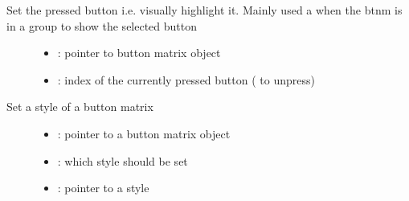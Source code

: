 \documentclass[letterpaper,10pt,english]{sphinxmanual}
\begin{document}
\begin{fulllineitems}
\label{\detokenize{object-types/btnm:_CPPv419lv_btnm_set_pressedPK8lv_obj_t8uint16_t}}%
\pysigstartmultiline
{}\label{\detokenize{object-types/btnm:lv__btnm_8h_1aead167ad0009cf37e4427a8b008c79ed}}%
\pysigstopmultiline
Set the pressed button i.e. visually highlight it. Mainly used a when the btnm is in a group to show the selected button \begin{description}
\item[{}] \leavevmode\begin{itemize}
\item {} 
: pointer to button matrix object 

\item {} 
: index of the currently pressed button ( to unpress) 

\end{itemize}

\end{description}


\end{fulllineitems}


\begin{fulllineitems}
\label{\detokenize{object-types/btnm:_CPPv417lv_btnm_set_styleP8lv_obj_t15lv_btnm_style_tPK10lv_style_t}}%
\pysigstartmultiline
{}\label{\detokenize{object-types/btnm:lv__btnm_8h_1a34087a880e2961906f9b157a9a70e205}}%
\pysigstopmultiline
Set a style of a button matrix \begin{description}
\item[{}] \leavevmode\begin{itemize}
\item {} 
: pointer to a button matrix object 

\item {} 
: which style should be set 

\item {} 
: pointer to a style 

\end{itemize}

\end{description}


\end{fulllineitems}
\end{document}
